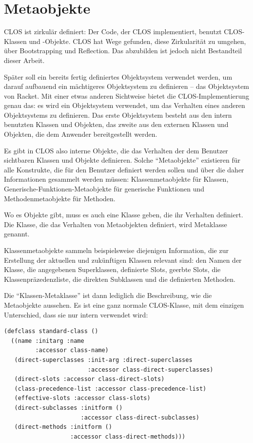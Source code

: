 \section{Metaobjekte}
CLOS ist zirkulär definiert: Der Code, der CLOS implementiert, benutzt CLOS-Klassen und -Objekte. CLOS hat Wege gefunden, diese Zirkularität zu umgehen, über Bootstrapping und Reflection. Das abzubilden ist jedoch nicht Bestandteil dieser Arbeit. 

Später soll ein bereits fertig definiertes Objektsystem verwendet werden, um darauf aufbauend ein mächtigeres Objektsystem zu definieren -- das Objektsystem von Racket. Mit einer etwas anderen Sichtweise bietet die CLOS-Implementierung genau das: es wird ein Objektsystem verwendet, um das Verhalten eines anderen Objektsystems zu definieren. Das erste Objektsystem besteht aus den intern benutzten Klassen und Objekten, das zweite aus den externen Klassen und Objekten, die dem Anwender bereitgestellt werden.

Es gibt in CLOS also interne Objekte, die das Verhalten der dem Benutzer sichtbaren Klassen und Objekte definieren. Solche ``Metaobjekte'' existieren für alle Konstrukte, die für den Benutzer definiert werden sollen und über die daher Informationen gesammelt werden müssen: Klassenmetaobjekte für Klassen, Generische-Funktionen-Metaobjekte für generische Funktionen und Methodenmetaobjekte für Methoden. 

Wo es Objekte gibt, muss es auch eine Klasse geben, die ihr Verhalten definiert. Die Klasse, die das Verhalten von Metaobjekten definiert, wird Metaklasse genannt. 

Klassenmetaobjekte sammeln beispielsweise diejenigen Information, die zur Erstellung der aktuellen und zukünftigen Klassen relevant sind: den Namen der Klasse, die angegebenen Superklassen, definierte Slots, geerbte Slots, die Klassenpräzedenzliste, die direkten Subklassen und die definierten Methoden. 

Die ``Klassen-Metaklasse'' ist dann lediglich die Beschreibung, wie die Metaobjekte aussehen. Es ist eine ganz normale CLOS-Klasse, mit dem einzigen Unterschied, dass sie nur intern verwendet wird:

\begin{lstlisting}
(defclass standard-class ()
  ((name :initarg :name
         :accessor class-name)
   (direct-superclasses :init-arg :direct-superclasses
                        :accessor class-direct-superclasses)
   (direct-slots :accessor class-direct-slots)
   (class-precedence-list :accessor class-precedence-list)
   (effective-slots :accessor class-slots)
   (direct-subclasses :initform ()
                      :accessor class-direct-subclasses)
   (direct-methods :initform ()
                   :accessor class-direct-methods)))
\end{lstlisting}

